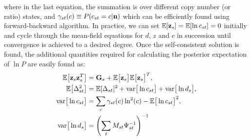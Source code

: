\documentclass[nofootinbib,amssymb,amsmath]{revtex4}
\newcommand{\vz}{{\bf z}}
\newcommand{\vn}{{\bf n}}
\newcommand{\vG}{{\bf G}}
\newcommand{\EE}{\mathbb{E}}
\begin{document}
where in the last equation, the summation is over different copy number (or ratio) states, and $\gamma_{st}(c) \equiv P(c_{st} = c | \vn)$ which can be efficiently found using forward-backward algorithm. In practice, we can set $\EE[\vz_s] = \EE[\ln c_{st}] = 0$ initially and cycle through the mean-field equations for $d$, $z$ and $c$ in succession until convergence is achieved to a desired degree. Once the self-consistent solution is found, the additional quantities required for calculating the posterior expectation of $\ln P$ are easily found as:
\begin{align}
\EE\big[\vz_s \vz_s^T \big] &= \vG_s + \EE\big[\vz_s\big] \EE\big[\vz_s\big]^T,\nonumber\\
\EE\big[\Delta_{st}^2\big] &= \EE[\Delta_{st}]^2 + \mathrm{var}\big[\ln c_{st}\big] + \mathrm{var}\big[\ln d_{s}\big],\nonumber\\
\mathrm{var}\big[\ln c_{st}\big] &= \sum_{c} \gamma_{st}(c) \ln^2(c) - \EE\big[\ln c_{st}\big]^2,\nonumber\\
\mathrm{var}\big[\ln d_s\big] &= \left(\sum_t M_{st} \Psi_{st}^{-1}\right)^{-1}
\end{align}
\end{document}
